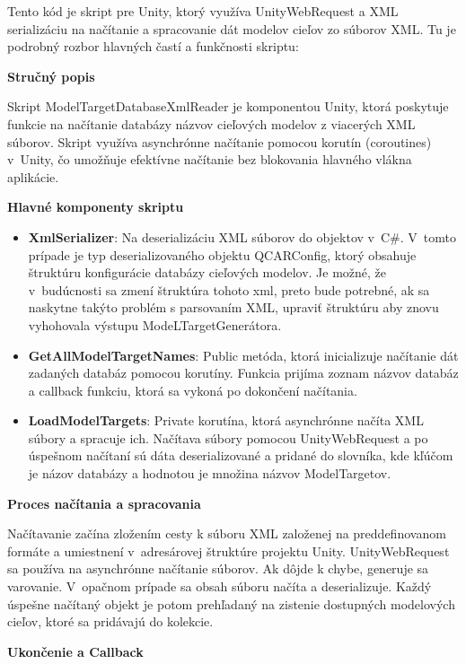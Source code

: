 Tento kód je skript pre Unity, ktorý využíva UnityWebRequest a XML serializáciu na načítanie a spracovanie dát modelov cieľov zo súborov XML. Tu je podrobný rozbor hlavných častí a funkčnosti skriptu:

{\normalsize\textbf{Stručný popis}} %

Skript ModelTargetDatabaseXmlReader je komponentou Unity, ktorá poskytuje funkcie na načítanie databázy názvov cieľových modelov z viacerých XML súborov. Skript využíva asynchrónne načítanie pomocou korutín (coroutines) v~Unity, čo umožňuje efektívne načítanie bez blokovania hlavného vlákna aplikácie.

{\normalsize\textbf{Hlavné komponenty skriptu}}

\begin{itemize}
    \item {\small\textbf{XmlSerializer}}: Na deserializáciu XML súborov do objektov v~C\#. V~tomto prípade je typ deserializovaného objektu QCARConfig, ktorý obsahuje štruktúru konfigurácie databázy cieľových modelov. Je možné, že v~budúcnosti sa zmení štruktúra tohoto xml, preto bude potrebné, ak sa naskytne takýto problém s parsovaním XML, upraviť štruktúru aby znovu vyhohovala výstupu ModeLTargetGenerátora.%
    \item {\small\textbf{GetAllModelTargetNames}}: Public metóda, ktorá inicializuje načítanie dát zadaných databáz pomocou korutíny. Funkcia prijíma zoznam názvov databáz a callback funkciu, ktorá sa vykoná po dokončení načítania.
    \item {\small\textbf{LoadModelTargets}}: Private korutína, ktorá asynchrónne načíta XML súbory a spracuje ich. Načítava súbory pomocou UnityWebRequest a po úspešnom načítaní sú dáta deserializované a pridané do slovníka, kde kľúčom je názov databázy a hodnotou je množina názvov ModelTargetov.
\end{itemize}

{\normalsize\textbf{Proces načítania a spracovania}}

Načítavanie začína zložením cesty k súboru XML založenej na preddefinovanom formáte a umiestnení v~adresárovej štruktúre projektu Unity. UnityWebRequest sa používa na asynchrónne načítanie súborov. Ak dôjde k chybe, generuje sa varovanie. V~opačnom prípade sa obsah súboru načíta a deserializuje. Každý úspešne načítaný objekt je potom prehľadaný na zistenie dostupných modelových cieľov, ktoré sa pridávajú do kolekcie.

{\normalsize\textbf{Ukončenie a Callback}}

